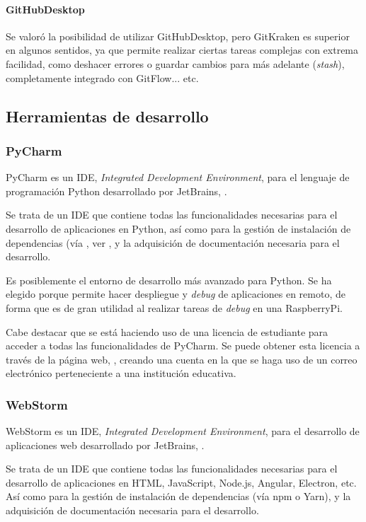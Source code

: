 \paragraph{GitHubDesktop}
Se valoró la posibilidad de utilizar GitHubDesktop, pero GitKraken es superior en algunos sentidos, ya que permite realizar ciertas tareas complejas con extrema facilidad, como deshacer errores o guardar cambios para más adelante (\textit{stash}), completamente integrado con GitFlow... etc.

\subsection{Herramientas de desarrollo}

\subsubsection{PyCharm}

PyCharm es un IDE, \textit{Integrated Development Environment}, para el lenguaje de programación Python desarrollado por JetBrains, \citep{wiki:PyCharm}. 

Se trata de un IDE que contiene todas las funcionalidades necesarias para el desarrollo de aplicaciones en Python, así como para la gestión de instalación de dependencias (vía , ver \citep{wiki:PyPa}, y la adquisición de documentación necesaria para el desarrollo. 

Es posiblemente el entorno de desarrollo más avanzado para Python. Se ha elegido porque permite hacer despliegue y \emph{debug} de aplicaciones en remoto, de forma que es de gran utilidad al realizar tareas de \emph{debug} en una RaspberryPi.

Cabe destacar que se está haciendo uso de una licencia de estudiante para acceder a todas las funcionalidades de PyCharm. Se puede obtener esta licencia a través de la página web, \citep{wiki:PyCharm}, creando una cuenta en la que se haga uso de un correo electrónico perteneciente a una institución educativa. 


\subsubsection{WebStorm}

WebStorm es un IDE, \textit{Integrated Development Environment}, para el desarrollo de aplicaciones web desarrollado por JetBrains, \citep{wiki:WebStorm}. 

Se trata de un IDE que contiene todas las funcionalidades necesarias para el desarrollo de aplicaciones en HTML, JavaScript, Node.js, Angular, Electron, etc. Así como para la gestión de instalación de dependencias (vía npm o Yarn), y la adquisición de documentación necesaria para el desarrollo. 

